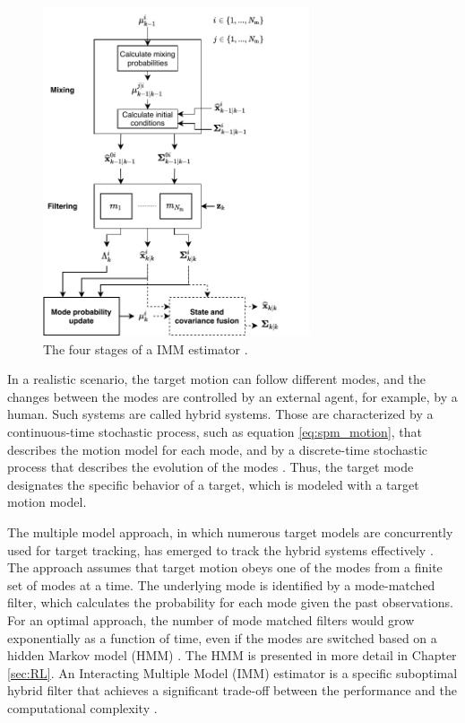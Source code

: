 \documentclass[english, 12pt, a4paper, elec, utf8, a-1b, online]{aaltothesis}
\numberwithin{equation}{section}
\begin{document}
\begin{figure}[t]
    \centering
    \includegraphics[width=0.7\textwidth]{figures/IMM.pdf}
    \caption{
    The four stages of a IMM estimator \cite{BarShalom2001}.}
    \label{fig:IMM}
\end{figure}

In a realistic scenario, the target motion can follow different modes, and the changes between the modes are controlled by an external agent, for example, by a human.
Such systems are called hybrid systems. 
Those are characterized by a continuous-time stochastic process, such as equation \eqref{eq:spm_motion}, that describes the motion model for each mode, and by a discrete-time stochastic process that describes the evolution of the modes \cite{BarShalom2001}.
Thus, the target mode designates the specific behavior of a target, which is modeled with a target motion model.

The multiple model approach, in which numerous target models are concurrently used for target tracking, has emerged to track the hybrid systems effectively \cite{BarShalom2001}.
The approach assumes that target motion obeys one of the modes from a finite set of modes at a time.
The underlying mode is identified by a mode-matched filter, which calculates the probability for each mode given the past observations.
For an optimal approach, the number of mode matched filters would grow exponentially as a function of time, even if the modes are switched based on a hidden Markov model (HMM) \cite{BarShalom2001}.
The HMM is presented in more detail in Chapter \ref{sec:RL}.
An Interacting Multiple Model (IMM) estimator is a specific suboptimal hybrid filter that achieves a significant trade-off between the performance and the computational complexity \cite{BarShalom2001}.
\end{document}
